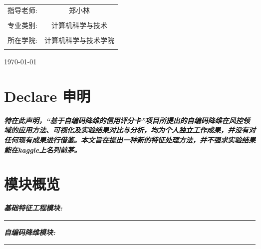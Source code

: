 \documentclass[11pt]{article}
\begin{document}
\begin{titlepage}
\begin{center}
\begin{center}
\begin{large}
\begin{tabular}{cc}
                    \cline{2-2}                                       \\
                    指导老师:    & 郑小林                             \\
                    \cline{2-2}                                       \\
                    专业类别:    & 计算机科学与技术                   \\
                    \cline{2-2}                                       \\
                    所在学院:    & 计算机科学与技术学院               \\
                    \cline{2-2}                                       \\
                \end{tabular}
            \end{large}
        \end{center}
        \LARGE\today
    \end{center}

\end{titlepage}



\newpage
\thispagestyle{empty} %

\section*{\LARGE  Declare 申明}
\paragraph{}
\textit{\bfseries \songti
    特在此声明，“基于自编码降维的信用评分卡”项目所提出的自编码降维在风控领域的应用方法、可视化及实验结果对比与分析，均为个人独立工作成果，并没有对任何现有成果进行借鉴。本文旨在提出一种新的特征处理方法，并不强求实验结果能在kaggle上名列前茅。}
\section*{\LARGE  模块概览}

\noindent  \textit{\bfseries \songti 基础特征工程模块:} \\[1mm]
\rule[1em]{30em}{0.5pt}

\noindent  \textit{\bfseries \songti 自编码降维模块:}\\[1mm]
\rule[1em]{30em}{0.5pt}
\end{document}

